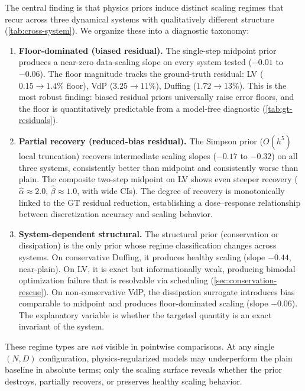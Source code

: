 \documentclass[11pt]{article}
\begin{document}
The central finding is that physics priors induce distinct scaling regimes that recur across three dynamical systems with qualitatively different structure (\cref{tab:cross-system}).
We organize these into a diagnostic taxonomy:

\begin{enumerate}[leftmargin=*]
    \item \textbf{Floor-dominated (biased residual).}
    The single-step midpoint prior produces a near-zero data-scaling slope on every system tested ($-0.01$ to $-0.06$).
    The floor magnitude tracks the ground-truth residual: LV ($0.15 \to 1.4\%$ floor), VdP ($3.25 \to 11\%$), Duffing ($1.72 \to 13\%$).
    This is the most robust finding: biased residual priors universally raise error floors, and the floor is quantitatively predictable from a model-free diagnostic (\cref{tab:gt-residuals}).

    \item \textbf{Partial recovery (reduced-bias residual).}
    The Simpson prior ($O(h^5)$ local truncation) recovers intermediate scaling slopes ($-0.17$ to $-0.32$) on all three systems, consistently better than midpoint and consistently worse than plain.
    The composite two-step midpoint on LV shows even steeper recovery ($\hat{\alpha} \approx 2.0$, $\hat{\beta} \approx 1.0$, with wide CIs).
    The degree of recovery is monotonically linked to the GT residual reduction, establishing a dose--response relationship between discretization accuracy and scaling behavior.

    \item \textbf{System-dependent structural.}
    The structural prior (conservation or dissipation) is the only prior whose regime classification changes across systems.
    On conservative Duffing, it produces healthy scaling (slope $-0.44$, near-plain).
    On LV, it is exact but informationally weak, producing bimodal optimization failure that is resolvable via scheduling (\cref{sec:conservation-rescue}).
    On non-conservative VdP, the dissipation surrogate introduces bias comparable to midpoint and produces floor-dominated scaling (slope $-0.06$).
    The explanatory variable is whether the targeted quantity is an exact invariant of the system.
\end{enumerate}

These regime types are \emph{not} visible in pointwise comparisons.
At any single $(N,D)$ configuration, physics-regularized models may underperform the plain baseline in absolute terms; only the scaling surface reveals whether the prior destroys, partially recovers, or preserves healthy scaling behavior.
\end{document}
